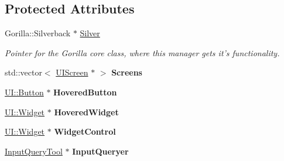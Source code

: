 \subsection*{Protected Attributes}
\begin{DoxyCompactItemize}
\item 
\hypertarget{classphys_1_1UIManager_ab4c5b8c7e3c4c7b03847b1af18bea02a}{
Gorilla::Silverback $\ast$ \hyperlink{classphys_1_1UIManager_ab4c5b8c7e3c4c7b03847b1af18bea02a}{Silver}}
\label{d5/dc5/classphys_1_1UIManager_ab4c5b8c7e3c4c7b03847b1af18bea02a}

\begin{DoxyCompactList}\small\item\em Pointer for the Gorilla core class, where this manager gets it's functionality. \item\end{DoxyCompactList}\item 
\hypertarget{classphys_1_1UIManager_ab8eb94c63e1be1acda3891cd1862cc4e}{
std::vector$<$ \hyperlink{classphys_1_1UIScreen}{UIScreen} $\ast$ $>$ {\bfseries Screens}}
\label{d5/dc5/classphys_1_1UIManager_ab8eb94c63e1be1acda3891cd1862cc4e}

\item 
\hypertarget{classphys_1_1UIManager_a37293b9d9ba8b05c9a03e4640a56c6c1}{
\hyperlink{classphys_1_1UI_1_1Button}{UI::Button} $\ast$ {\bfseries HoveredButton}}
\label{d5/dc5/classphys_1_1UIManager_a37293b9d9ba8b05c9a03e4640a56c6c1}

\item 
\hypertarget{classphys_1_1UIManager_a3bcf192e061273695e99a85484c5056a}{
\hyperlink{classphys_1_1UI_1_1Widget}{UI::Widget} $\ast$ {\bfseries HoveredWidget}}
\label{d5/dc5/classphys_1_1UIManager_a3bcf192e061273695e99a85484c5056a}

\item 
\hypertarget{classphys_1_1UIManager_ab99d10c888ad3fb1cc3aebd9e497ce7a}{
\hyperlink{classphys_1_1UI_1_1Widget}{UI::Widget} $\ast$ {\bfseries WidgetControl}}
\label{d5/dc5/classphys_1_1UIManager_ab99d10c888ad3fb1cc3aebd9e497ce7a}

\item 
\hypertarget{classphys_1_1UIManager_a0ae28b65bf930af50026f410b449d43b}{
\hyperlink{classphys_1_1InputQueryTool}{InputQueryTool} $\ast$ {\bfseries InputQueryer}}
\label{d5/dc5/classphys_1_1UIManager_a0ae28b65bf930af50026f410b449d43b}

\end{DoxyCompactItemize}


